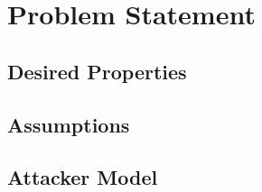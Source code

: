 \chapter{Problem Statement}
\label{ch:problem}

\section{Desired Properties}
\label{sec:problem:properties}


\section{Assumptions}
\label{sec:problem:assumptions}

\section{Attacker Model}
\label{sec:problem:attacker}

